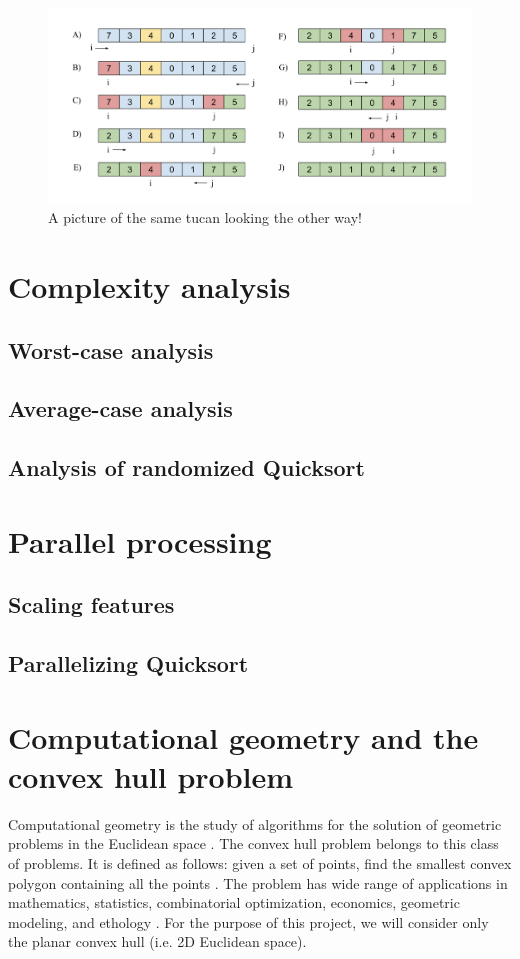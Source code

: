 \documentclass[]{finalproject}
\begin{document}
\begin{figure}[H]
  \begin{center}
   \includegraphics[scale=0.5]{img/pivot_partitioning.png}
  \end{center}
  \caption{A picture of the same tucan looking the other way!}
\end{figure}

 


\section{Complexity analysis}
\subsection{Worst-case analysis}
\subsection{Average-case analysis}
\subsection{Analysis of randomized Quicksort}

\section{Parallel processing}
\subsection{Scaling features}
\subsection{Parallelizing Quicksort}

\section{Computational geometry and the convex hull problem}
Computational geometry is the study of algorithms for the solution of geometric problems in the Euclidean space \cite{paper}.
The convex hull problem belongs to this class of problems. It is defined as follows:
given a set of points, find the smallest convex polygon containing all the points \cite{geowiki}.
The problem has wide range of applications in
mathematics, statistics, combinatorial optimization, economics, geometric modeling, and ethology \cite{chwiki}.
For the purpose of this project, we will consider only the planar convex hull (i.e. 2D Euclidean space).
\end{document}
